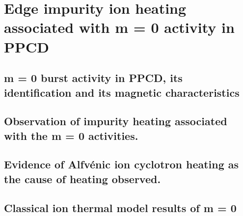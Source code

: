 \chapter{Edge impurity ion heating associated with m = 0 activity in PPCD}

\section{m = 0 burst activity in PPCD, its identification and its magnetic characteristics}

\section{Observation of impurity heating associated with the m = 0 activities.}

\section{Evidence of Alfv\'enic ion cyclotron heating as the cause of heating observed.}

\section{Classical ion thermal model results of m = 0}